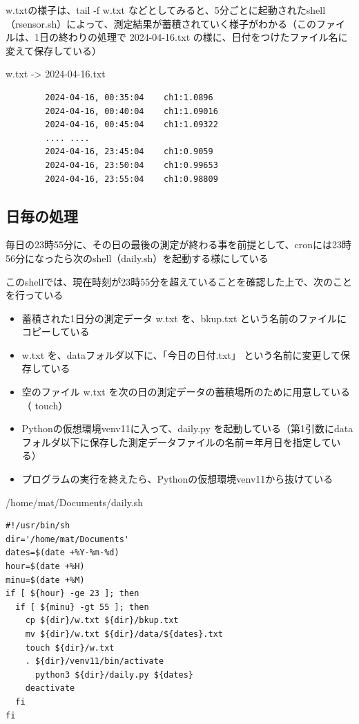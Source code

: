 \documentclass[12pt,a4paper,uplatex]{jsbook}
\begin{document}
w.txtの様子は、tail -f w.txt などとしてみると、5分ごとに起動されたshell（rsensor.sh）によって、測定結果が蓄積されていく様子がわかる（このファイルは、1日の終わりの処理で 2024-04-16.txt の様に、日付をつけたファイル名に変えて保存している）

\begin{itembox}[l]{w.txt -> 2024-04-16.txt}
	\begin{verbatim}
		2024-04-16, 00:35:04	ch1:1.0896
		2024-04-16, 00:40:04	ch1:1.09016
		2024-04-16, 00:45:04	ch1:1.09322
		.... ....
		2024-04-16, 23:45:04	ch1:0.9059
		2024-04-16, 23:50:04	ch1:0.99653
		2024-04-16, 23:55:04	ch1:0.98809
	\end{verbatim}
\end{itembox}

\subsection{日毎の処理}

毎日の23時55分に、その日の最後の測定が終わる事を前提として、cronには23時56分になったら次のshell（daily.sh）を起動する様にしている

このshellでは、現在時刻が23時55分を超えていることを確認した上で、次のことを行っている
\begin{itemize}
	\item 蓄積された1日分の測定データ w.txt を、bkup.txt という名前のファイルにコピーしている
	\item w.txt を、dataフォルダ以下に、「今日の日付.txt」 という名前に変更して保存している
	\item 空のファイル w.txt を次の日の測定データの蓄積場所のために用意している（ touch）
	\item Pythonの仮想環境venv11に入って、daily.py を起動している（第1引数にdataフォルダ以下に保存した測定データファイルの名前＝年月日を指定している）
	\item プログラムの実行を終えたら、Pythonの仮想環境venv11から抜けている
\end{itemize}

\begin{itembox}[l]{/home/mat/Documents/daily.sh}
	\begin{verbatim}
#!/usr/bin/sh
dir='/home/mat/Documents'
dates=$(date +%Y-%m-%d)
hour=$(date +%H)
minu=$(date +%M)
if [ ${hour} -ge 23 ]; then
  if [ ${minu} -gt 55 ]; then
    cp ${dir}/w.txt ${dir}/bkup.txt
    mv ${dir}/w.txt ${dir}/data/${dates}.txt
    touch ${dir}/w.txt
    . ${dir}/venv11/bin/activate
      python3 ${dir}/daily.py ${dates}
    deactivate
  fi
fi
	\end{verbatim}
\end{itembox}
\end{document}
